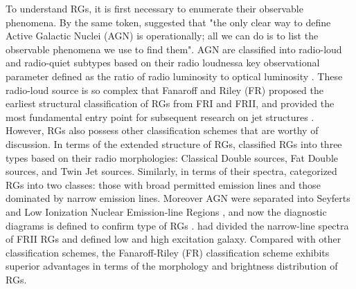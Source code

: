 \documentclass{aa}
\begin{document}
To understand RGs, it is first necessary to enumerate their observable phenomena. By the same token, \citep{krolik_active_1999} suggested that "the only clear way to define Active Galactic Nuclei (AGN) is operationally; all we can do is to list the observable phenomena we use to find them". AGN are classified into radio-loud and radio-quiet subtypes based on their radio loudness\textemdash a key observational parameter defined as the ratio of radio luminosity to optical luminosity \citep{kellermann_vla_1989,sikora_radio_2007}. These radio-loud source is so complex that Fanaroff and Riley (FR) proposed the earliest structural classification of RGs from FRI and FRII, and provided the most fundamental entry point for subsequent research on jet structures \citep{fanaroff_morphology_1974}. However, RGs also possess other classification schemes that are worthy of discussion. In terms of the extended structure of RGs, \cite{owen_ccd_1989} classified RGs into three types based on their radio morphologies: Classical Double sources, Fat Double sources, and Twin Jet sources. Similarly, in terms of their spectra, \cite{osterbrock_broad_1975} categorized RGs into two classes: those with broad permitted emission lines and those dominated by narrow emission lines. Moreover AGN were separated into Seyferts and Low Ionization Nuclear Emission-line Regions \citep{heckman_optical_1980}, and now the diagnostic diagrams is defined to confirm type of RGs \citep{veilleux_spectral_1987}. \cite{laing_spectrophotometry_1994} had divided the narrow-line spectra of FRII RGs and defined low and high excitation galaxy. Compared with other classification schemes, the Fanaroff-Riley (FR) classification scheme exhibits superior advantages in terms of the morphology and brightness distribution of RGs.
\end{document}
